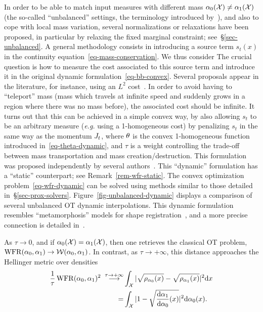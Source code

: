 In order to be able to match input measures with different mass $\alpha_0(\mathcal{X}) \neq \alpha_1(\mathcal{X})$ (the so-called ``unbalanced'' settings, the terminology introduced by~\citet{benamou2003numerical}), and also to cope with local mass variation,
%
several normalizations or relaxations have been proposed, in particular by relaxing the fixed marginal constraint; see~\S\ref{sec-unbalanced}. 
A general methodology consists in introducing a source term $s_t(x)$ in the continuity equation~\eqref{eq-mass-conservation}. We thus consider 
The crucial question is how to measure the cost associated to this source term and introduce it in the original dynamic formulation~\eqref{eq-bb-convex}. Several proposals appear in the literature, for instance, using an $L^2$ cost~\citet{piccoli2014generalized}.  
%
In order to avoid having to ``teleport'' mass (mass which travels at infinite speed and suddenly grows in a region where there was no mass before), the associated cost should be infinite. It turns out that this can be achieved in a simple convex way, by also allowing $s_t$ to be an arbitrary measure (\emph{e.g.} using a 1-homogeneous cost) by penalizing $s_t$ in the same way as the momentum $J_t$, 
where $\theta$ is the convex 1-homogeneous function introduced in~\eqref{eq-theta-dynamic}, and $\tau$ is a weight controlling the trade-off between mass transportation and mass creation/destruction. This formulation was proposed independently by several authors~\citep{LieroMielkeSavareShort,2017-chizat-focm,kondratyev2015}. This ``dynamic'' formulation has a ``static'' counterpart; see Remark~\ref{rem-wfr-static}. 
%
The convex optimization problem~\eqref{eq-wfr-dynamic} can be solved using methods similar to those detailed in~\S\ref{sec-prox-solvers}. 
%
Figure~\ref{fig-unbalanced-dynamic} displays a comparison of several unbalanced OT dynamic interpolations.
%
This dynamic formulation resembles ``metamorphosis'' models for shape registration~\citep{Metamorphosis2005}, and a more precise connection is detailed in~\citep{maas2015generalized,maas2016generalized}. 

As $\tau \rightarrow 0$, and if $\alpha_0(\mathcal{X}) = \alpha_1(\mathcal{X})$, then one retrieves the classical OT problem, $\operatorname{WFR}(\alpha_0,\alpha_1) \rightarrow \operatorname{\mathcal{W}}(\alpha_0,\alpha_1)$. In contrast, as $\tau \rightarrow +\infty$, this distance approaches the Hellinger metric over densities
\begin{align*}
	\frac{1}{\tau}\operatorname{WFR}(\alpha_0,\alpha_1)^2\; \overset{\tau \rightarrow +\infty} \longrightarrow 
	&\int_{\mathcal{X}} | \sqrt{\rho_{\alpha_0}(x)} - \sqrt{\rho_{\alpha_1}(x)} |^2 \mathrm{d} x \\
	=& \int_{\mathcal{X}} | 1 - \sqrt{ \frac{\mathrm{d}\alpha_1}{\mathrm{d}\alpha_0}(x) } |^2 \mathrm{d} \alpha_0(x).
\end{align*}

